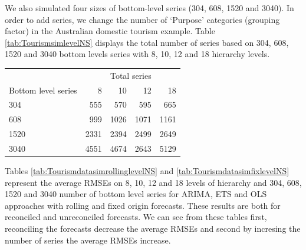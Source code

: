 \documentclass[11pt,a4paper,]{article}
\let\origtable\table
\let\endorigtable\endtable
\renewenvironment{table}[1][2] {
    \expandafter\origtable\expandafter[!htbp]
} {
    \endorigtable
}
\begin{document}
We also simulated four sizes of bottom-level series (304, 608, 1520 and 3040). In order to add series, we change the number of `Purpose' categories (grouping factor) in the Australian domestic tourism example. Table \ref{tab:TourismsimlevelNS} displays the total number of series based on 304, 608, 1520 and 3040 bottom levels series with 8, 10, 12 and 18 hierarchy levels.

\begin{table}

\caption{\label{tab:TourismsimlevelNS}Total number of the series in the hierarchy structure based on the different number of series with 8, 10, 12 and 18 levels of the hierarchy.}
\centering
\begin{tabular}[t]{lrrrr}
\toprule
\multicolumn{1}{c}{} & \multicolumn{4}{c}{Total series} \\
\cmidrule(l{3pt}r{3pt}){2-5}
Bottom level series & 8 & 10 & 12 & 18\\
\midrule
304 & 555 & 570 & 595 & 665\\
608 & 999 & 1026 & 1071 & 1161\\
1520 & 2331 & 2394 & 2499 & 2649\\
3040 & 4551 & 4674 & 2643 & 5129\\
\bottomrule
\end{tabular}
\end{table}

Tables \ref{tab:TourismdatasimrollinglevelNS} and \ref{tab:TourismdatasimfixlevelNS} represent the average RMSEs on 8, 10, 12 and 18 levels of hierarchy and 304, 608, 1520 and 3040 number of bottom level series for ARIMA, ETS and OLS approaches with rolling and fixed origin forecasts. These results are both for reconciled and unreconciled forecasts. We can see from these tables first, reconciling the forecasts decrease the average RMSEs and second by incresing the number of series the average RMSEs increase.
\end{document}
